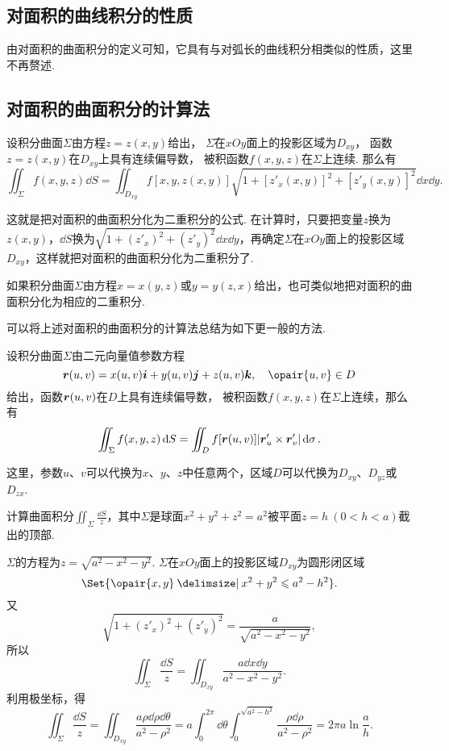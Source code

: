 \subsection{对面积的曲线积分的性质}
由对面积的曲面积分的定义可知，它具有与对弧长的曲线积分相类似的性质，这里不再赘述.

\subsection{对面积的曲面积分的计算法}
\begin{theorem}
设积分曲面\(\Sigma\)由方程\(z=z(x,y)\)给出，%
\(\Sigma\)在\(xOy\)面上的投影区域为\(D_{xy}\)，%
函数\(z=z(x,y)\)在\(D_{xy}\)上具有连续偏导数，%
被积函数\(f(x,y,z)\)在\(\Sigma\)上连续.
那么有\[
\iint_{\Sigma}{f(x,y,z)\dd{S}}
=\iint_{D_{xy}}{f[x,y,z(x,y)] \sqrt{1+[z'_x(x,y)]^2+[z'_y(x,y)]^2} \dd{x}\dd{y}}.
\]
\end{theorem}
这就是把对面积的曲面积分化为二重积分的公式.
在计算时，只要把变量\(z\)换为\(z(x,y)\)，\(\dd{S}\)换为\(\sqrt{1+(z'_x)^2+(z'_y)^2} \dd{x}\dd{y}\)，再确定\(\Sigma\)在\(xOy\)面上的投影区域\(D_{xy}\)，这样就把对面积的曲面积分化为二重积分了.

如果积分曲面\(\Sigma\)由方程\(x=x(y,z)\)或\(y=y(z,x)\)给出，也可类似地把对面积的曲面积分化为相应的二重积分.

可以将上述对面积的曲面积分的计算法总结为如下更一般的方法.
\begin{theorem}
设积分曲面\(\Sigma\)由二元向量值参数方程\[
\mat{r}(u,v) = x(u,v) \mat{i} + y(u,v) \mat{j} + z(u,v) \mat{k},
\quad \opair{u,v} \in D
\]给出，函数\(\boldsymbol{r}(u,v)\)在\(D\)上具有连续偏导数，%
被积函数\(f(x,y,z)\)在\(\Sigma\)上连续，那么有\[
\iint_{\Sigma} f(x,y,z) \dd{S}
= \iint_D f[\boldsymbol{r}(u,v)] \abs{\boldsymbol{r}'_u \times \boldsymbol{r}'_v} \dd{\sigma}.
\]
\end{theorem}
这里，参数\(u\)、\(v\)可以代换为\(x\)、\(y\)、\(z\)中任意两个，区域\(D\)可以代换为\(D_{xy}\)、\(D_{yz}\)或\(D_{zx}\).

\begin{example}
计算曲面积分\(\iint_{\Sigma} \frac{\dd{S}}{z}\)，其中\(\Sigma\)是球面\(x^2+y^2+z^2=a^2\)被平面\(z = h\ (0<h<a)\)截出的顶部.
\begin{solution}
\(\Sigma\)的方程为\(z = \sqrt{a^2-x^2-y^2}\).
\(\Sigma\)在\(xOy\)面上的投影区域\(D_{xy}\)为圆形闭区域\[
\Set{\opair{x,y} \given x^2+y^2 \leqslant a^2-h^2}.
\]又\[
\sqrt{1+(z'_x)^2+(z'_y)^2} = \frac{a}{\sqrt{a^2-x^2-y^2}},
\]所以\[
\iint_{\Sigma} \frac{\dd{S}}{z}
= \iint_{D_{xy}} \frac{a\dd{x}\dd{y}}{a^2-x^2-y^2}.
\]利用极坐标，得\[
\iint_{\Sigma} \frac{\dd{S}}{z}
= \iint_{D_{xy}} \frac{a\rho\dd{\rho}\dd{\theta}}{a^2-\rho^2}
= a \int_0^{2\pi} \dd{\theta} \int_0^{\sqrt{a^2-h^2}} \frac{\rho\dd{\rho}}{a^2-\rho^2}
= 2\pi a \ln\frac{a}{h}.
\]
\end{solution}
\end{example}

